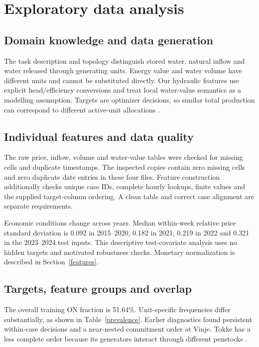 \documentclass[a4paper,11pt]{article}
\begin{document}
\section{Exploratory data analysis}
\subsection*{Domain knowledge and data generation}
The task description and topology distinguish stored water, natural inflow and water released through generating units. Energy value and water volume have different units and cannot be substituted directly. Our hydraulic features use explicit head/efficiency conversions and treat local water-value semantics as a modelling assumption. Targets are optimizer decisions, so similar total production can correspond to different active-unit allocations \cite{physics,structure}.

\subsection*{Individual features and data quality}
The raw price, inflow, volume and water-value tables were checked for missing cells and duplicate timestamps. The inspected copies contain zero missing cells and zero duplicate date entries in these four files. Feature construction additionally checks unique case IDs, complete hourly lookups, finite values and the supplied target-column ordering. A clean table and correct case alignment are separate requirements.

Economic conditions change across years. Median within-week relative price standard deviation is 0.092 in 2015--2020, 0.182 in 2021, 0.219 in 2022 and 0.321 in the 2023--2024 test inputs. This descriptive test-covariate analysis uses no hidden targets and motivated robustness checks. Monetary normalization is described in Section~\ref{features}.

\subsection*{Targets, feature groups and overlap}
The overall training ON fraction is 51.64\%. Unit-specific frequencies differ substantially, as shown in Table~\ref{prevalence}. Earlier diagnostics found persistent within-case decisions and a near-nested commitment order at Vinje. Tokke has a less complete order because its generators interact through different penstocks \cite{structure}.
\end{document}
